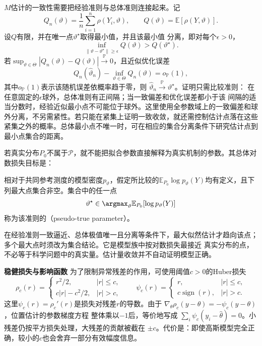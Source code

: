 \(M\)估计的一致性需要把经验准则与总体准则连接起来。记
\[
  Q_n(\vartheta)=\frac1n\sum_{i=1}^n\rho(Y_i,\vartheta),
  \qquad
  Q(\vartheta)=\mathbb{E}[\rho(Y,\vartheta)].
\]
设\(Q\)有限，并在唯一点\(\vartheta^\star\)取得最小值，并且该最小值
分离，即对每个\(\epsilon>0\)，
\[
  \inf_{\lVert\vartheta-\vartheta^\star\rVert\geq\epsilon}
  Q(\vartheta)>Q(\vartheta^\star).
\]
若\(\sup_{\vartheta\in\Theta}|Q_n(\vartheta)-Q(\vartheta)|
\xrightarrow{\mathbb{P}}0\)，且近似优化误差
\[
  Q_n(\widehat\vartheta_n)-\inf_{\vartheta\in\Theta}Q_n(\vartheta)
  =o_{\mathbb{P}}(1),
\]
其中\(o_{\mathbb{P}}(1)\)表示该随机误差依概率趋于零，则
\(\widehat\vartheta_n\xrightarrow{\mathbb{P}}\vartheta^\star\)。证明只需比较准则：
在任意固定的\(\epsilon\)球外，总体准则有正间隔；当一致偏差和优化误差都小于该
间隔的适当分数时，经验近似最小点不可能位于球外。这里使用全参数域上的一致偏差和球外分离，不另需紧性。若只能在紧集上证明一致收敛，就还需控制估计点落在这些紧集之外的概率。总体最小点不唯一时，可在相应的集合分离条件下研究估计点到最小点集合的距离。

若真实分布\(P_0\)不属于\(\mathcal P\)，就不能把拟合参数直接解释为真实机制的参数。其总体对数损失目标是：
\begin{definition}[伪真参数]
  \label{def:statistics-pseudo-true-parameter}
相对于共同参考测度的模型密度\(p_\vartheta\)，假定所比较的\(\mathbb E_{P_0}\log p_\vartheta(Y)\)均有定义，且下列最大点集合非空。集合中的任一点
\[
  \vartheta^\star
  \in\argmax_\vartheta\mathbb{E}_{P_0}[\log p_\vartheta(Y)]
\]
称为该准则的（pseudo-true parameter）。
\end{definition}
在经验准则一致逼近、总体极值唯一且分离等条件下，最大似然估计才趋向该点；多个最大点时须改为集合结论。它是模型族中按对数损失最接近
真实分布的点，不必等于科学问题中的真实量。估计量收敛并不自动证明模型正确。

\par\medskip\noindent\textbf{稳健损失与影响函数}\quad
为了限制异常残差的作用，可使用阈值\(c>0\)的Huber损失
\[
  \rho_c(r)=
  \begin{cases}
    r^2/2,& |r|\leq c,\\
    c|r|-c^2/2,& |r|>c,
  \end{cases}
  \qquad
  \psi_c(r)=
  \begin{cases}
    r,& |r|\leq c,\\
    c\operatorname{sign}(r),& |r|>c.
  \end{cases}
\]
这里\(\psi_c(r)=\rho_c'(r)\)是损失对残差\(r\)的导数。由于
\(\nabla_\theta\rho_c(y-\theta)=-\psi_c(y-\theta)\)，位置估计的参数梯度方程
整体乘以\(-1\)后，等价地写成
\(\sum_i\psi_c(y_i-\widehat\theta)=0\)。小残差仍按平方损失处理，大残差的贡献被截在
\(\pm c\)。代价是：即使高斯模型完全正确，较小的\(c\)也会舍弃一部分有效幅度信息。

